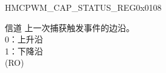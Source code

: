 \begin{register}{H}{MCPWM\_CAP\_STATUS\_REG}{0x0108}\label{regdesc:MCPWMCAPSTATUSREG}
%
%
%
%
\regnewline%
\begin{regdesc}\begin{reglist}
\label{fielddesc:MCPWMCAPNEDGE}\item [MCPWM\_CAP\regindex{n}\_EDGE] 信道 上一次捕获触发事件的边沿。\\0：上升沿\\1：下降沿 \\(RO)
\end{reglist}\end{regdesc}
\end{register}


